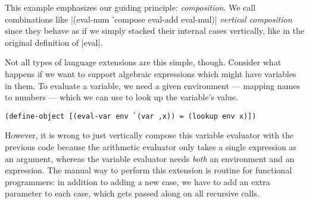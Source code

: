 This example emphasizes our guiding principle: \emph{composition}.
We call combinations like \scm|(eval-num 'compose eval-add eval-mul)| \emph{vertical composition} since they behave as if we simply stacked their internal cases vertically, like in the original definition of \scm|eval|.

Not all types of language extensions are this simple, though.
Consider what happens if we want to support algebraic expressions which might have variables in them.
To evaluate a variable, we need a given environment --- mapping names to numbers --- which we can use to look up the variable's value.
\begin{verbatim}
(define-object [(eval-var env `(var ,x)) = (lookup env x)])
\end{verbatim}
However, it is wrong to just vertically compose this variable evaluator with the previous code because the arithmetic evaluator only takes a single expression as an argument, whereas the variable evaluator needs \emph{both} an environment and an expression.
The manual way to perform this extension is routine for functional programmers: in addition to adding a new case, we have to add an extra parameter to each case, which gets passed along on all recursive calls.

